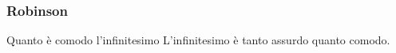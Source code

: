 \begin{frame}[label=Robinson]
  \frametitle{Robinson}
  \begin{block}{Quanto è comodo l'infinitesimo}
    L'infinitesimo è tanto assurdo quanto comodo.
  \end{block}
\end{frame}
